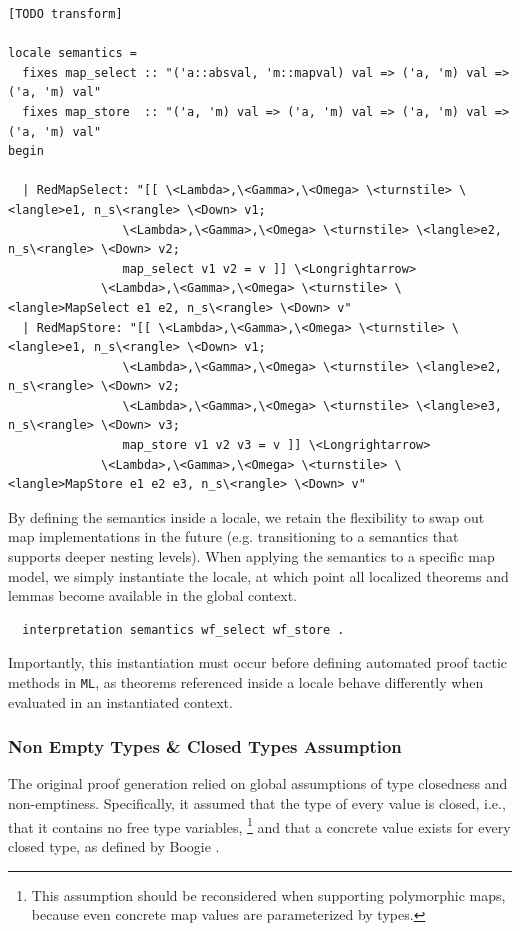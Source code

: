 \documentclass[11pt]{article}
\begin{document}
\begin{verbatim}
[TODO transform]

locale semantics =
  fixes map_select :: "('a::absval, 'm::mapval) val => ('a, 'm) val => ('a, 'm) val"
  fixes map_store  :: "('a, 'm) val => ('a, 'm) val => ('a, 'm) val => ('a, 'm) val"
begin

  | RedMapSelect: "[[ \<Lambda>,\<Gamma>,\<Omega> \<turnstile> \<langle>e1, n_s\<rangle> \<Down> v1;
                \<Lambda>,\<Gamma>,\<Omega> \<turnstile> \<langle>e2, n_s\<rangle> \<Down> v2;
                map_select v1 v2 = v ]] \<Longrightarrow>
             \<Lambda>,\<Gamma>,\<Omega> \<turnstile> \<langle>MapSelect e1 e2, n_s\<rangle> \<Down> v"
  | RedMapStore: "[[ \<Lambda>,\<Gamma>,\<Omega> \<turnstile> \<langle>e1, n_s\<rangle> \<Down> v1;
                \<Lambda>,\<Gamma>,\<Omega> \<turnstile> \<langle>e2, n_s\<rangle> \<Down> v2;
                \<Lambda>,\<Gamma>,\<Omega> \<turnstile> \<langle>e3, n_s\<rangle> \<Down> v3;
                map_store v1 v2 v3 = v ]] \<Longrightarrow>
             \<Lambda>,\<Gamma>,\<Omega> \<turnstile> \<langle>MapStore e1 e2 e3, n_s\<rangle> \<Down> v"
\end{verbatim}


By defining the semantics inside a locale,
we retain the flexibility to swap out map implementations in the future
(e.g. transitioning to a semantics that supports deeper nesting levels).
When applying the semantics to a specific map model, we simply instantiate the locale,
at which point all localized theorems and lemmas become available in the global context.

\begin{verbatim}
  interpretation semantics wf_select wf_store .
\end{verbatim}

Importantly, this instantiation must occur before defining automated proof tactic methods in \texttt{ML},
as theorems referenced inside a locale behave differently when evaluated in an instantiated context.


\subsubsection{Non Empty Types \& Closed Types Assumption}
\label{sec:non-empty-types}


The original proof generation relied on global assumptions of type closedness and non-emptiness.
Specifically, it assumed that the type of every value is closed, i.e., that it contains no free type variables,
\footnote{This assumption should be reconsidered when supporting polymorphic maps,
because even concrete map values are parameterized by types.}
and that a concrete value exists for every closed type,
as defined by Boogie \cite{leino2008boogie}.
\end{document}
